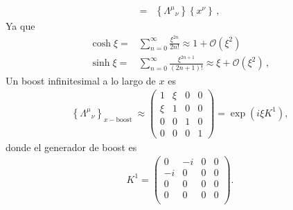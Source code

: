 \begin{frame}
\begin{align}
=&\left\{{\Lambda^\mu}_{\nu}\right\}\left\{x^\nu\right\}\,,
\end{align}
  Ya que
\begin{align}
  \cosh\xi=&\sum_{n=0}^{\infty}\frac{\xi^{2n}}{2n!}\approx 1+\mathcal{O}(\xi^2)\nonumber\\
  \sinh\xi=&\sum_{n=0}^{\infty}\frac{\xi^{2n+1}}{(2n+1)!}\approx \xi+\mathcal{O}(\xi^2)\,,
\end{align}
  Un boost infinitesimal a lo largo de $x$ es
\begin{align}
  \left\{{\Lambda^\mu}_{\nu}\right\}_{x-\text{boost }}\approx
  \begin{pmatrix}
    1&\xi&0&0\\
    \xi&1&0&0\\
    0&0&1&0\\
    0&0&0&1
  \end{pmatrix}=\exp \left( i\xi  K^1 \right),
\end{align}
donde el generador de boost es
\begin{align}
 K^1= \begin{pmatrix}
    0 & -i & 0 & 0\\
   -i & 0  & 0 & 0\\
   0 & 0 &  0 & 0\\
    0 & 0 &  0 & 0\\ 
  \end{pmatrix}.
\end{align}


\end{frame}

